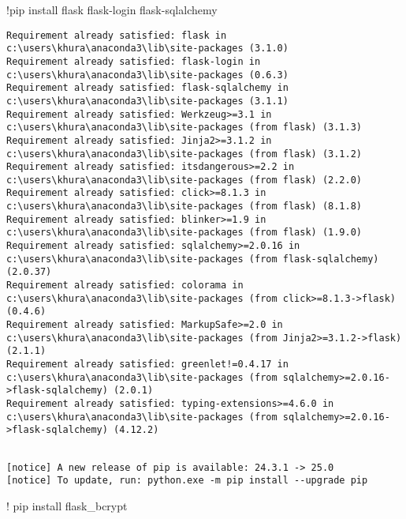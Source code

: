 \documentclass[
  letterpaper,
  DIV=11,
  numbers=noendperiod]{scrreprt}
\author{}
\date{}
\newenvironment{Shaded}{\begin{snugshade}}{\end{snugshade}}
\newcommand{\NormalTok}[1]{\textcolor[rgb]{0.00,0.23,0.31}{#1}}
\newcommand{\OperatorTok}[1]{\textcolor[rgb]{0.37,0.37,0.37}{#1}}
\begin{document}
\begin{Shaded}
\begin{Highlighting}[]
\OperatorTok{!}\NormalTok{pip install flask flask}\OperatorTok{{-}}\NormalTok{login flask}\OperatorTok{{-}}\NormalTok{sqlalchemy}
\end{Highlighting}
\end{Shaded}

\begin{verbatim}
Requirement already satisfied: flask in c:\users\khura\anaconda3\lib\site-packages (3.1.0)
Requirement already satisfied: flask-login in c:\users\khura\anaconda3\lib\site-packages (0.6.3)
Requirement already satisfied: flask-sqlalchemy in c:\users\khura\anaconda3\lib\site-packages (3.1.1)
Requirement already satisfied: Werkzeug>=3.1 in c:\users\khura\anaconda3\lib\site-packages (from flask) (3.1.3)
Requirement already satisfied: Jinja2>=3.1.2 in c:\users\khura\anaconda3\lib\site-packages (from flask) (3.1.2)
Requirement already satisfied: itsdangerous>=2.2 in c:\users\khura\anaconda3\lib\site-packages (from flask) (2.2.0)
Requirement already satisfied: click>=8.1.3 in c:\users\khura\anaconda3\lib\site-packages (from flask) (8.1.8)
Requirement already satisfied: blinker>=1.9 in c:\users\khura\anaconda3\lib\site-packages (from flask) (1.9.0)
Requirement already satisfied: sqlalchemy>=2.0.16 in c:\users\khura\anaconda3\lib\site-packages (from flask-sqlalchemy) (2.0.37)
Requirement already satisfied: colorama in c:\users\khura\anaconda3\lib\site-packages (from click>=8.1.3->flask) (0.4.6)
Requirement already satisfied: MarkupSafe>=2.0 in c:\users\khura\anaconda3\lib\site-packages (from Jinja2>=3.1.2->flask) (2.1.1)
Requirement already satisfied: greenlet!=0.4.17 in c:\users\khura\anaconda3\lib\site-packages (from sqlalchemy>=2.0.16->flask-sqlalchemy) (2.0.1)
Requirement already satisfied: typing-extensions>=4.6.0 in c:\users\khura\anaconda3\lib\site-packages (from sqlalchemy>=2.0.16->flask-sqlalchemy) (4.12.2)
\end{verbatim}

\begin{verbatim}

[notice] A new release of pip is available: 24.3.1 -> 25.0
[notice] To update, run: python.exe -m pip install --upgrade pip
\end{verbatim}

\begin{Shaded}
\begin{Highlighting}[]
\OperatorTok{!}\NormalTok{ pip install flask\_bcrypt}
\end{Highlighting}
\end{Shaded}
\end{document}
